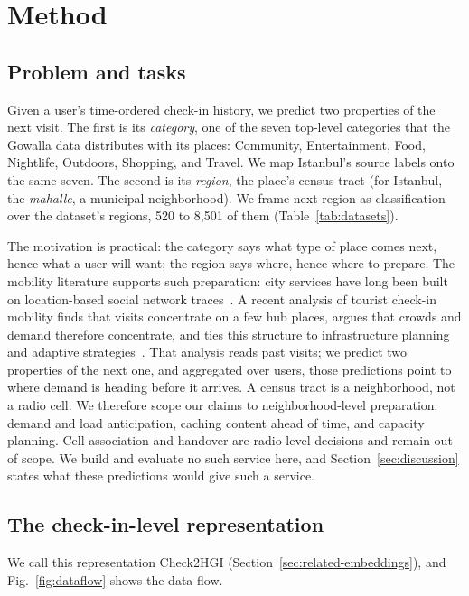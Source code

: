 \section{Method}
\label{sec:method}

\subsection{Problem and tasks}
\label{sec:problem}
Given a user's time-ordered check-in history, we predict two properties of the next visit. The first is its \emph{category}, one of the seven top-level categories that the Gowalla data distributes with its places: Community, Entertainment, Food,
Nightlife, Outdoors, Shopping, and Travel. We map Istanbul's source labels onto the same seven.
The second is its \emph{region}, the place's census tract (for Istanbul, the \emph{mahalle}, a municipal neighborhood). We frame next-region as classification over the dataset's regions, 520 to 8,501 of them (Table~\ref{tab:datasets}).

The motivation is practical: the category says what type of place comes next, hence what a user will want; the region says where, hence where to prepare. The mobility literature supports such preparation: city services have long been built on location-based social network traces~\cite{silva2019urbancomputing}. A recent analysis of tourist check-in
mobility finds that visits concentrate on a few hub places, argues that crowds and demand therefore concentrate, and ties this structure to
infrastructure planning and adaptive strategies~\cite{moura2025mobilityaware}.
That analysis reads past visits; we predict two properties of
the next one, and aggregated over users, those predictions point to where
demand is heading before it arrives. A census
tract is a neighborhood, not a radio cell. We therefore scope our claims to
neighborhood-level preparation: demand and load anticipation, caching content
ahead of time, and capacity planning. Cell association and handover are
radio-level decisions and remain out of scope. We build and evaluate no such
service here, and Section~\ref{sec:discussion} states what these predictions
would give such a service.


\subsection{The check-in-level representation}
\label{sec:method-rep}

We call this representation Check2HGI (Section~\ref{sec:related-embeddings}), and Fig.~\ref{fig:dataflow} shows the data flow.

